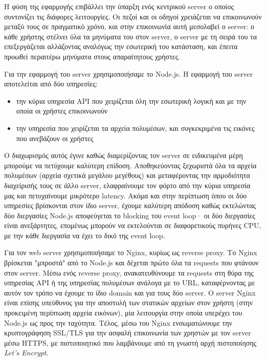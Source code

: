 \documentclass[../thesis.tex]{subfiles}
\begin{document}
Η φύση της εφαρμογής επιβάλλει την ύπαρξη ενός κεντρικού server ο οποίος συντονίζει τις διάφορες λειτουργίες.
Οι πεζοί και οι οδηγοί χρειάζεται να επικοινωνούν μεταξύ τους σε πραγματικό χρόνο, και στην επικοινωνία αυτή μεσολαβεί ο server: ο κάθε χρήστης στέλνει όλα τα μηνύματα του στον server, ο server με τη σειρά του τα επεξεργάζεται αλλάζοντας αναλόγως την εσωτερική του κατάσταση, και έπειτα προωθεί περαιτέρω μηνύματα στους απαραίτητους χρήστες.

Για την εφαρμογή του server χρησιμοποιήσαμε το Node.js.
Η εφαρμογή του server αποτελείται από δύο υπηρεσίες:
\begin{itemize}
    \item την κύρια υπηρεσία API που χειρίζεται όλη την εσωτερική λογική και με την οποία οι χρήστες επικοινωνούν
    \item την υπηρεσία που χειρίζεται τα αρχεία πολυμέσων, και συγκεκριμένα τις εικόνες που ανεβάζουν οι χρήστες
\end{itemize}
Ο διαχωρισμός αυτός έγινε καθώς διαμερίζοντας τον server σε ειδικευμένα μέρη μπορούμε να πετύχουμε καλύτερη επίδοση.
Αποθηκεύοντας ξεχωριστά όλα τα αρχεία πολυμέσων (αρχεία σχετικά μεγάλου μεγέθους) και μεταφέροντας την αρμοδιότητα διαχείρισής τους σε άλλο server, ελαφραίνουμε τον φόρτο από την κύρια υπηρεσία μας και πετυχαίνουμε μικρότερο latency.
Ακόμα και στην περίπτωση όπου οι δύο υπηρεσίες βρίσκονται στον ίδιο server, έχουμε καλύτερη απόδοση καθώς εκτελώντας δύο διεργασίες Node.js αποφεύγεται το blocking του event loop· οι δύο διεργασίες είναι ανεξάρτητες, επομένως μπορούν να εκτελούνται σε διαφορετικούς πυρήνες CPU, με την κάθε διεργασία να έχει το δικό της event loop.

Για τον web server χρησιμοποιήσαμε το Nginx, κυρίως ως reverse proxy.
Το Nginx βρίσκεται "μπροστά" από το Node.js και δέχεται πρώτο όλα τα requests που φτάνουν στον server.
Μέσω ενός reverse proxy, ανακατευθύνουμε τα requests στη θύρα της υπηρεσίας API ή της υπηρεσίας πολυμέσων ανάλογα με το URL, καταφέρνοντας με αυτόν τον τρόπο να έχουμε το ίδιο domain και για τους δύο server.
Ο server Nginx είναι επίσης υπεύθυνος για την αποστολή των στατικών αρχείων στον χρήστη (στην προκειμένη περίπτωση αρχεία εικόνων), μία λειτουργία στην οποία υπερέχει του Node.js ως προς την ταχύτητα.
Τέλος, μέσω του Nginx ενσωματώνουμε την κρυπτογράφηση SSL/TLS για την ασφαλή επικοινωνία των χρηστών με τον server μέσω HTTPS, με πιστοποιητικό που λαμβάνουμε από τη γνωστή αρχή πιστοποίησης \textit{Let's Encrypt}.
\end{document}
